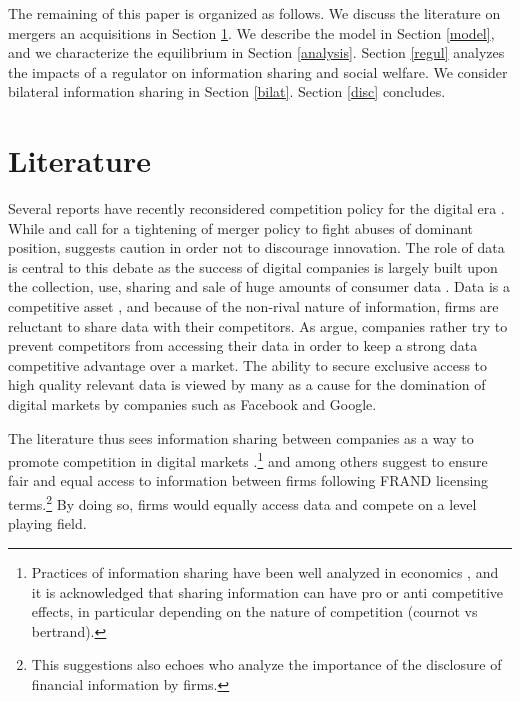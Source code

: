 \documentclass[a4paper,leqno]{article}%
\begin{document}
The remaining of this paper is organized as follows. We discuss the literature on mergers an acquisitions in Section \ref{lit}. We describe the model in Section \ref{model}, and we characterize the equilibrium in Section \ref{analysis}. Section \ref{regul} analyzes the impacts of a regulator on information sharing and social welfare. We consider bilateral information sharing in Section \ref{bilat}. Section \ref{disc} concludes.




\section{Literature}\label{lit}

Several reports have recently reconsidered competition policy for the digital era \citep{federico2019antitrust}. While \cite{scott2019committee} and \cite{shapiro2019protecting} call for a tightening of merger policy to fight abuses of dominant position, \cite{cabral2021merger} suggests caution in order not to discourage innovation. The role of data is central to this debate as  the success of digital companies is largely built upon the collection, use, sharing and sale of huge amounts of consumer data \citep{varian1989price, bergemann2015selling}. Data is a competitive asset \citep{hagiu2020data}, and because of the non-rival nature of information, firms are reluctant to share data with their competitors. As \cite{jones2020nonrivalry} argue, companies rather try to prevent competitors from accessing their data in order to keep a strong data competitive advantage over a market. The ability to secure exclusive access to high quality relevant data is viewed by many as a cause for the domination of digital markets by companies such as Facebook and Google. 

The literature thus sees information sharing between companies as a way to promote competition in digital markets \citep{martens2020business}.\footnote{Practices of information sharing have been well analyzed in economics \citep{vives1984duopoly, gal1986information}, and it is acknowledged that sharing information can have pro or anti competitive effects, in particular depending on the nature of competition (cournot vs bertrand).} \cite{tirole2020competition} and \cite{cremer2019competition} among others suggest to ensure fair and equal access to information between firms following FRAND licensing terms.\footnote{This suggestions also echoes \cite{admati2000forcing} who analyze the importance of the disclosure of financial information by firms.} By doing so, firms would equally access data and compete on a level playing field. 
\end{document}
